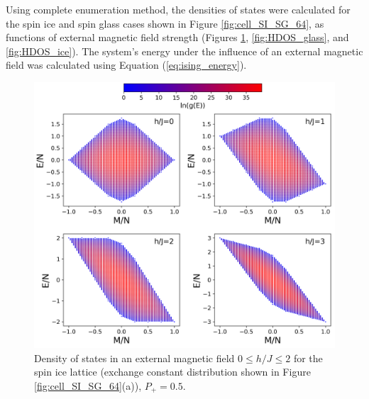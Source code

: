 \documentclass[preprint,12pt]{elsarticle}
\begin{document}
	Using complete enumeration method, the densities of states were calculated for the spin ice and spin glass cases shown in Figure \ref{fig:cell_SI_SG_64}, as functions of external magnetic field strength (Figures \ref{fig:HDOS_ice_1}, \ref{fig:HDOS_glass}, and \ref{fig:HDOS_ice}).
	The system's energy under the influence of an external magnetic field was calculated using Equation (\ref{eq:ising_energy}).
	
	\begin{figure}[H]
		\centering
		\includegraphics[width=1\linewidth]{pictures/HDOS_SI_64_J0_1.png}
		\caption{Density of states in an external magnetic field $0\leq h/J \leq 2$ for the spin ice lattice (exchange constant distribution shown in Figure \ref{fig:cell_SI_SG_64}(a)), $P_+ = 0.5$.}
		\label{fig:HDOS_ice_1}
	\end{figure}
	
\end{document}
